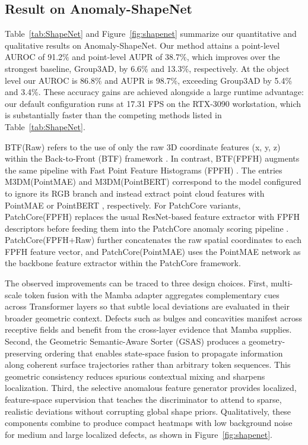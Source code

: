 \subsection{Result on Anomaly-ShapeNet}
\label{sec:results-shapenet}

Table~\ref{tab:ShapeNet} and Figure~\ref{fig:shapenet} summarize our quantitative and qualitative results on Anomaly-ShapeNet. Our method attains a point-level AUROC of 91.2\% and point-level AUPR of 38.7\%, which improves over the strongest baseline, Group3AD, by 6.6\% and 13.3\%, respectively. At the object level our AUROC is 86.8\% and AUPR is 98.7\%, exceeding Group3AD by 5.4\% and 3.4\%. These accuracy gains are achieved alongside a large runtime advantage: our default configuration runs at 17.31 FPS on the RTX-3090 workstation, which is substantially faster than the competing methods listed in Table~\ref{tab:ShapeNet}.

BTF(Raw) refers to the use of only the raw 3D coordinate features (x, y, z) within the Back-to-Front (BTF) framework \cite{horwitz2023back}. In contrast, BTF(FPFH) augments the same pipeline with Fast Point Feature Histograms (FPFH) \cite{rusu2009fast}. The entries M3DM(PointMAE) and M3DM(PointBERT) correspond to the model \cite{wang2023multimodal} configured to ignore its RGB branch and instead extract point cloud features with PointMAE \cite{pang2022masked} or PointBERT \cite{yu2022point}, respectively. For PatchCore variants, PatchCore(FPFH) replaces the usual ResNet-based feature extractor with FPFH descriptors \cite{rusu2009fast} before feeding them into the PatchCore anomaly scoring pipeline \cite{roth2022towards}. PatchCore(FPFH+Raw) further concatenates the raw spatial coordinates to each FPFH feature vector, and PatchCore(PointMAE) uses the PointMAE network \cite{pang2022masked} as the backbone feature extractor within the PatchCore framework.

The observed improvements can be traced to three design choices. First, multi-scale token fusion with the Mamba adapter aggregates complementary cues across Transformer layers so that subtle local deviations are evaluated in their broader geometric context. Defects such as bulges and concavities manifest across receptive fields and benefit from the cross-layer evidence that Mamba supplies. Second, the Geometric Semantic-Aware Sorter (GSAS) produces a geometry-preserving ordering that enables state-space fusion to propagate information along coherent surface trajectories rather than arbitrary token sequences. This geometric consistency reduces spurious contextual mixing and sharpens localization. Third, the selective anomalous feature generator provides localized, feature-space supervision that teaches the discriminator to attend to sparse, realistic deviations without corrupting global shape priors. Qualitatively, these components combine to produce compact heatmaps with low background noise for medium and large localized defects, as shown in Figure~\ref{fig:shapenet}.

